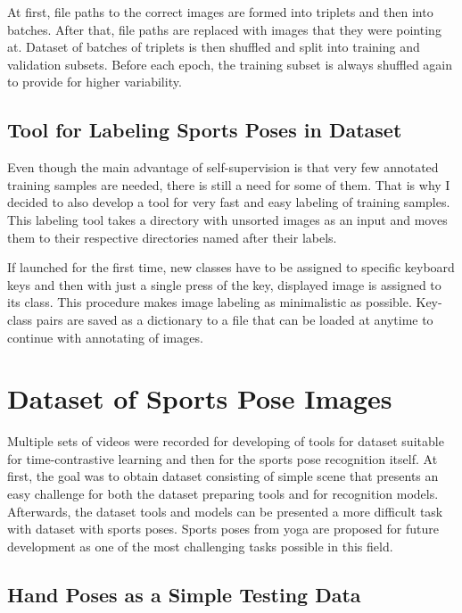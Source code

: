 At first, file paths to the correct images are formed into triplets and then into batches. After that, file paths are replaced with images that they were pointing at. Dataset of batches of triplets is then shuffled and split into training and validation subsets. Before each epoch, the training subset is always shuffled again to provide for higher variability.

\subsection{\label{sec:dataset-label-tool}Tool for Labeling Sports Poses in Dataset}

Even though the main advantage of self-supervision is that very few annotated training samples are needed, there is still a need for some of them. That is why I decided to also develop a tool for very fast and easy labeling of training samples. This labeling tool takes a directory with unsorted images as an input and moves them to their respective directories named after their labels.

If launched for the first time, new classes have to be assigned to specific keyboard keys and then with just a single press of the key, displayed image is assigned to its class. This procedure makes image labeling as minimalistic as possible. Key-class pairs are saved as a dictionary to a file that can be loaded at anytime to continue with annotating of images.

\section{\label{sec:dataset-sports-poses}Dataset of Sports Pose Images}

Multiple sets of videos were recorded for developing of tools for dataset suitable for time-contrastive learning and then for the sports pose recognition itself. At first, the goal was to obtain dataset consisting of simple scene that presents an easy challenge for both the dataset preparing tools and for recognition models. Afterwards, the dataset tools and models can be presented a more difficult task with dataset with sports poses. Sports poses from yoga are proposed for future development as one of the most challenging tasks possible in this field.

\subsection{Hand Poses as a Simple Testing Data}

